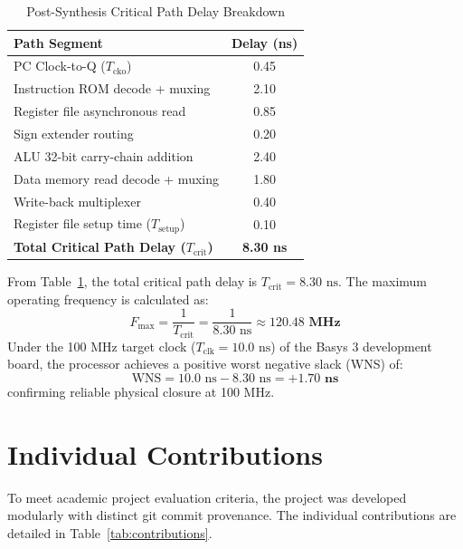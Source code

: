 \documentclass[conference]{IEEEtran}
\begin{document}
\begin{table}[htbp]
\caption{Post-Synthesis Critical Path Delay Breakdown}
\label{tab:critical_path}
\begin{center}
\begin{tabular}{lc}
\toprule
\textbf{Path Segment} & \textbf{Delay (ns)} \\
\midrule
PC Clock-to-Q ($T_{\text{cko}}$) & 0.45 \\
Instruction ROM decode + muxing & 2.10 \\
Register file asynchronous read & 0.85 \\
Sign extender routing & 0.20 \\
ALU 32-bit carry-chain addition & 2.40 \\
Data memory read decode + muxing & 1.80 \\
Write-back multiplexer & 0.40 \\
Register file setup time ($T_{\text{setup}}$) & 0.10 \\
\midrule
\textbf{Total Critical Path Delay ($T_{\text{crit}}$)} & \textbf{8.30 ns} \\
\bottomrule
\end{tabular}
\end{center}
\end{table}

From Table~\ref{tab:critical_path}, the total critical path delay is $T_{\text{crit}} = 8.30\text{ ns}$. The maximum operating frequency is calculated as:
\begin{equation}
F_{\max} = \frac{1}{T_{\text{crit}}} = \frac{1}{8.30\text{ ns}} \approx \mathbf{120.48\text{ MHz}}
\end{equation}
Under the 100 MHz target clock ($T_{\text{clk}} = 10.0\text{ ns}$) of the Basys 3 development board, the processor achieves a positive worst negative slack (WNS) of:
\begin{equation}
\text{WNS} = 10.0\text{ ns} - 8.30\text{ ns} = \mathbf{+1.70\text{ ns}}
\end{equation}
confirming reliable physical closure at 100 MHz.

\section{Individual Contributions}
To meet academic project evaluation criteria, the project was developed modularly with distinct git commit provenance. The individual contributions are detailed in Table~\ref{tab:contributions}.
\end{document}
